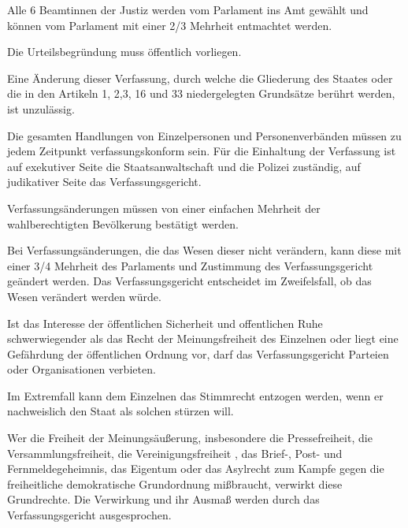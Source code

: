 \documentclass{sasbase}
\begin{document}
\begin{article}
	\item Alle 6 Beamtinnen der Justiz werden vom Parlament ins Amt gewählt und können vom Parlament mit einer 2/3 Mehrheit entmachtet werden.
	\item Die Urteilsbegründung muss öffentlich vorliegen.
\end{article}


\begin{article}[Ewigkeitsklausel]
	\item Eine Änderung dieser Verfassung, durch welche die Gliederung des Staates oder die in den Artikeln 1, 2,3, 16 und 33 niedergelegten Grundsätze berührt werden, ist unzulässig.
\end{article}

\begin{article}
	\item Die gesamten Handlungen von Einzelpersonen und Personenverbänden müssen zu jedem Zeitpunkt verfassungskonform sein. Für die Einhaltung der Verfassung ist auf exekutiver Seite die Staatsanwaltschaft und die Polizei zuständig, auf judikativer Seite das Verfassungsgericht.
	\item Verfassungsänderungen müssen von einer einfachen Mehrheit der wahlberechtigten Bevölkerung bestätigt werden.
	\item Bei Verfassungsänderungen, die das Wesen dieser nicht verändern, kann diese mit einer 3/4 Mehrheit des Parlaments und Zustimmung des Verfassungsgericht geändert werden. Das Verfassungsgericht entscheidet im Zweifelsfall, ob das Wesen verändert werden würde.
\end{article}

\begin{article}
	\item Ist das Interesse der öffentlichen Sicherheit und offentlichen Ruhe schwerwiegender als das Recht der Meinungsfreiheit des Einzelnen oder liegt eine Gefährdung der öffentlichen Ordnung vor, darf das Verfassungsgericht Parteien oder Organisationen verbieten.
	\item Im Extremfall kann dem Einzelnen das Stimmrecht entzogen werden, wenn er nachweislich den Staat als solchen stürzen will.
	\item Wer die Freiheit der Meinungsäußerung, insbesondere die Pressefreiheit, die Versammlungsfreiheit, die Vereinigungsfreiheit , das Brief-, Post- und Fernmeldegeheimnis, das Eigentum oder das Asylrecht zum Kampfe gegen die freiheitliche demokratische Grundordnung mißbraucht, verwirkt diese Grundrechte. Die Verwirkung und ihr Ausmaß werden durch das Verfassungsgericht ausgesprochen.
\end{article}
\end{document}
